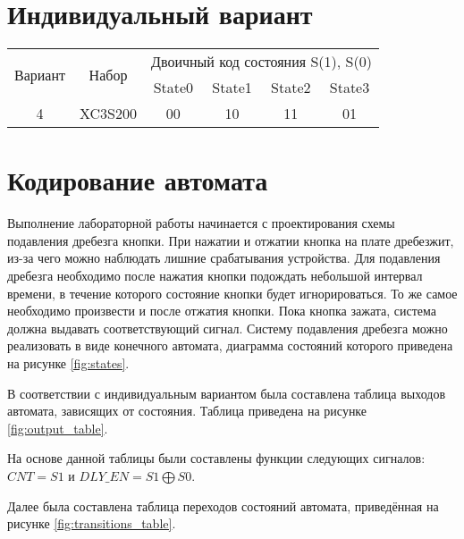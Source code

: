 \documentclass[a4paper, 14pt]{extarticle}
\begin{document}
    \section*{Индивидуальный вариант}
    \begin{table}[H]
        \begin{center}
            \begin{tabular}{|c|c|c|c|c|c|}
                \hline
                \multirow{2}{*}{Вариант} & \multirow{2}{*}{Набор} & \multicolumn{4}{|c|}{Двоичный код состояния S(1), S(0) } \\
                \cline{3-6}
                & &State0 &State1 &State2 &State3 \\
                \hline
                4 & XC3S200 & 00& 10 & 11 & 01 \\
                \hline
            \end{tabular}
        \end{center}
    \end{table}
    \pagebreak

    \section{Кодирование автомата}
    Выполнение лабораторной работы начинается с проектирования схемы подавления дребезга кнопки.
    При нажатии и отжатии кнопка на плате дребезжит, из-за чего можно наблюдать лишние срабатывания устройства.
    Для подавления дребезга необходимо после нажатия кнопки подождать небольшой интервал времени, в течение которого состояние кнопки будет игнорироваться.
    То же самое необходимо произвести и после отжатия кнопки. Пока кнопка зажата, система должна выдавать соответствующий сигнал.
    Систему подавления дребезга можно реализовать в виде конечного автомата, диаграмма состояний которого приведена на рисунке \ref{fig:states}.

    В соответствии с индивидуальным вариантом была составлена таблица выходов автомата, зависящих от состояния.
    Таблица приведена на рисунке \ref{fig:output_table}.

    На основе данной таблицы были составлены функции следующих сигналов: $CNT=S1$ и $DLY\_EN=S1\bigoplus S0$.

    Далее была составлена таблица переходов состояний автомата, приведённая на рисунке \ref{fig:transitions_table}.
\end{document}
